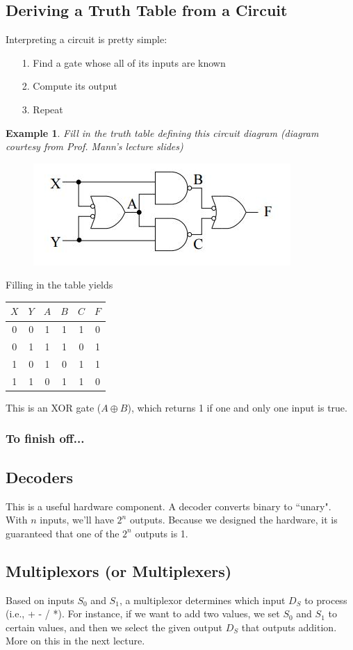 \documentclass{report}
\newtheorem{ex}{Example}[section]
\begin{document}
\subsection{Deriving a Truth Table from a Circuit}
Interpreting a circuit is pretty simple:
\begin{itemize}
\item[1.] Find a gate whose all of its inputs are known
\item[2.] Compute its output
\item[3.] Repeat
\end{itemize}
\begin{ex}
Fill in the truth table defining this circuit diagram (diagram courtesy from Prof. Mann's lecture slides)
\end{ex}
\begin{figure}[ht]
\begin{center}
\includegraphics[scale=0.5]{circuit_diagram.jpg}
\end{center}
\end{figure}
Filling in the table yields
\begin{center}
\begin{tabular}{ c c | c c c | c}
$X$ & $Y$ & $A$ &$B$ &$C$ & $F$ \\ \hline
0 & 0 & 1 & 1 & 1 & 0\\
0 & 1 & 1 & 1 & 0 & 1\\
1 & 0 & 1 & 0 & 1 & 1\\
1 & 1 & 0 & 1 & 1 & 0\\
\end{tabular}
\end{center}
This is an XOR gate ($A \oplus B$), which returns 1 if one and only one input is true.
\subsubsection{To finish off...}
\subsection{Decoders}
This is a useful hardware component. A decoder converts binary to ``unary". With $n$ inputs, we'll have $2^n$ outputs. Because we designed the hardware, it is guaranteed that one of the $2^n$ outputs is 1.

\subsection{Multiplexors (or Multiplexers)}
Based on inputs $S_0$ and $S_1$, a multiplexor determines which input $D_S$ to process (i.e., + - / *). For instance, if we want to add two values, we set $S_0$ and $S_1$ to certain values, and then we select the given output $D_S$ that outputs addition. More on this in the next lecture.
\end{document}
